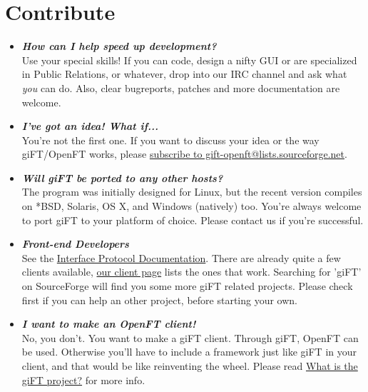 \documentclass[10pt]{article}
\newcommand{\question}[1]{\item\textbf{\emph{#1}}}
\begin{document}
\section{Contribute}
\begin{itemize}

\question {How can I help speed up development?}\\
Use your special skills! If you can code, design a nifty GUI or
are specialized in Public Relations, or whatever, drop into our
IRC channel and ask what \emph{you} can do.  Also, clear
bugreports, patches and more documentation are welcome.

\question {I've got an idea! What if...}\\
You're not the first one. If you want to discuss your idea or the
way giFT/OpenFT works, please
\href{http://lists.sourceforge.net/lists/listinfo/gift-openft}{subscribe
to gift-openft@lists.sourceforge.net}.

\question {Will giFT be ported to any other hosts?}\\
The program was initially designed for Linux, but the recent
version compiles on *BSD, Solaris, OS X, and Windows (natively)
too. You're always welcome to port giFT to your platform of
choice. Please contact us if you're successful.

\question {Front-end Developers}\\
See the
\href{http://gift.sourceforge.net/docs.php?document=interface.html}{Interface
Protocol Documentation}. There are already quite a few clients
available, \href{http://gift.sourceforge.net/dev/clients.php}{our
client page} lists the ones that work. Searching for 'giFT' on
SourceForge will find you some more giFT related projects. Please
check first if you can help an other project, before starting your
own.

\question {I want to make an OpenFT client!}\\
No, you don't. You want to make a giFT client. Through giFT,
OpenFT can be used. Otherwise you'll have to include a framework
just like giFT in your client, and that would be like reinventing
the wheel. Please read
\href{http://gift.sourceforge.net/docs.php?document=whatis.html}{What
is the giFT project?} for more info.

\end{itemize}
\end{document}
